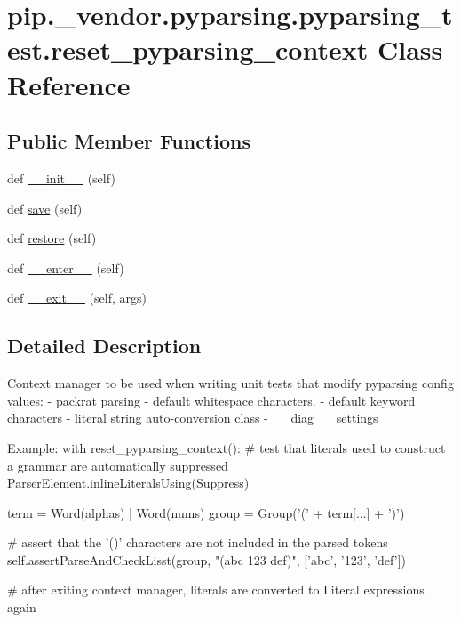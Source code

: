 \hypertarget{classpip_1_1__vendor_1_1pyparsing_1_1pyparsing__test_1_1reset__pyparsing__context}{}\section{pip.\+\_\+vendor.\+pyparsing.\+pyparsing\+\_\+test.\+reset\+\_\+pyparsing\+\_\+context Class Reference}
\label{classpip_1_1__vendor_1_1pyparsing_1_1pyparsing__test_1_1reset__pyparsing__context}
\subsection*{Public Member Functions}
\begin{DoxyCompactItemize}
\item 
def \hyperlink{classpip_1_1__vendor_1_1pyparsing_1_1pyparsing__test_1_1reset__pyparsing__context_a3f515b1e7dc70dade4cd6598516eb9b5}{\+\_\+\+\_\+init\+\_\+\+\_\+} (self)
\item 
def \hyperlink{classpip_1_1__vendor_1_1pyparsing_1_1pyparsing__test_1_1reset__pyparsing__context_a3f3c83458537994b396f7815214e0ce2}{save} (self)
\item 
def \hyperlink{classpip_1_1__vendor_1_1pyparsing_1_1pyparsing__test_1_1reset__pyparsing__context_aab165f6c441fa15c4639ba03c10934df}{restore} (self)
\item 
def \hyperlink{classpip_1_1__vendor_1_1pyparsing_1_1pyparsing__test_1_1reset__pyparsing__context_af39d93999257444feb2eb8925f58814b}{\+\_\+\+\_\+enter\+\_\+\+\_\+} (self)
\item 
def \hyperlink{classpip_1_1__vendor_1_1pyparsing_1_1pyparsing__test_1_1reset__pyparsing__context_a4c2e0e7c805fb4f272dbfd10a52f7a17}{\+\_\+\+\_\+exit\+\_\+\+\_\+} (self, args)
\end{DoxyCompactItemize}


\subsection{Detailed Description}
\begin{DoxyVerb}Context manager to be used when writing unit tests that modify pyparsing config values:
 - packrat parsing
 - default whitespace characters.
 - default keyword characters
 - literal string auto-conversion class
 - __diag__ settings

Example:
    with reset_pyparsing_context():
# test that literals used to construct a grammar are automatically suppressed
ParserElement.inlineLiteralsUsing(Suppress)

term = Word(alphas) | Word(nums)
group = Group('(' + term[...] + ')')

# assert that the '()' characters are not included in the parsed tokens
self.assertParseAndCheckLisst(group, "(abc 123 def)", ['abc', '123', 'def'])

    # after exiting context manager, literals are converted to Literal expressions again
\end{DoxyVerb}
 

